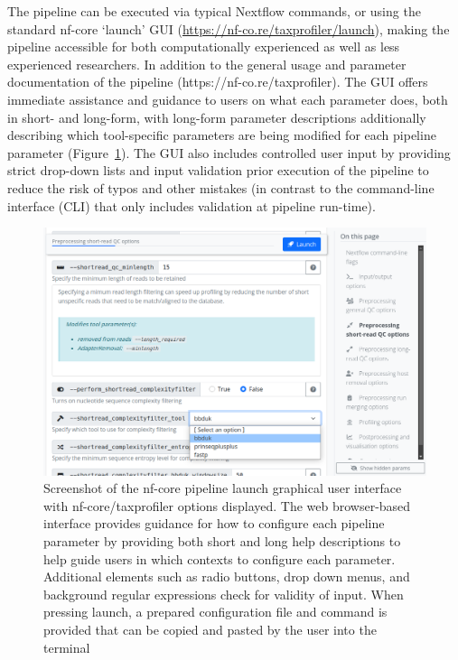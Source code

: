 \documentclass[
]{article}
\begin{document}
The pipeline can be executed via typical Nextflow commands, or using the
standard nf-core `launch' GUI
(\url{https://nf-co.re/taxprofiler/launch}), making the pipeline
accessible for both computationally experienced as well as less
experienced researchers. In addition to the general usage and parameter
documentation of the pipeline (https://nf-co.re/taxprofiler). The GUI
offers immediate assistance and guidance to users on what each parameter
does, both in short- and long-form, with long-form parameter
descriptions additionally describing which tool-specific parameters are
being modified for each pipeline parameter
(Figure~\ref{fig-launch-page}). The GUI also includes controlled user
input by providing strict drop-down lists and input validation prior
execution of the pipeline to reduce the risk of typos and other mistakes
(in contrast to the command-line interface (CLI) that only includes
validation at pipeline run-time).

\begin{figure}

{\centering \includegraphics{taxprofiler_launchpage.png}

}

\caption{\label{fig-launch-page}Screenshot of the nf-core pipeline
launch graphical user interface with nf-core/taxprofiler options
displayed. The web browser-based interface provides guidance for how to
configure each pipeline parameter by providing both short and long help
descriptions to help guide users in which contexts to configure each
parameter. Additional elements such as radio buttons, drop down menus,
and background regular expressions check for validity of input. When
pressing launch, a prepared configuration file and command is provided
that can be copied and pasted by the user into the terminal}

\end{figure}
\end{document}
